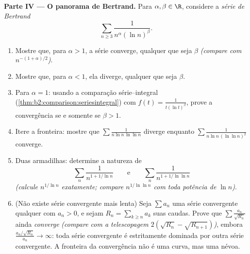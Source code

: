 \begin{problem}[{Problema de fim de semana --- $\zeta(2) = \pi^2/6$ e o
panorama de Bertrand}]
\medskip
\noindent\textbf{Parte IV --- O panorama de Bertrand.} Para $\alpha,
\beta \in \R$, considere a \emph{série de Bertrand}
\[
\sum_{n \geq 3} \frac{1}{n^{\alpha}(\ln n)^{\beta}} .
\]
\begin{enumerate}[resume]
  \item Mostre que, para $\alpha > 1$, a série converge,
        qualquer que seja $\beta$ \emph{(compare com
        $n^{-(1+\alpha)/2}$)}.
  \item Mostre que, para $\alpha < 1$, ela diverge, qualquer que seja
        $\beta$.
  \item Para $\alpha = 1$: usando a comparação série--integral
        (\cref{thm:b2:comparison:seriesintegral}) com $f(t) =
        \frac{1}{t(\ln t)^\beta}$, prove a convergência se e somente se $\beta
        > 1$.
  \item Itere a fronteira: mostre que $\sum\frac{1}{n\ln n\,\ln\ln
        n}$ diverge enquanto $\sum\frac{1}{n\ln n\,(\ln\ln n)^2}$
        converge.
  \item Duas armadilhas: determine a natureza de
        \[
        \sum_n \frac{1}{n^{1 + 1/\ln n}}
        \qquad\text{e}\qquad
        \sum_n \frac{1}{n^{1 + 1/\ln\ln n}}
        \]
        \emph{(calcule $n^{1/\ln n}$ exatamente; compare
        $n^{1/\ln\ln n}$ com toda potência de $\ln n$)}.
  \item (Não existe série convergente mais lenta) Seja $\sum a_n$ uma
        série convergente qualquer com $a_n > 0$, e sejam $R_n = \sum_{k
        \geq n}a_k$ suas caudas. Prove que $\sum
        \frac{a_n}{\sqrt{R_n}}$ ainda \emph{converge}
        \emph{(compare com a telescopagem $2(\sqrt{R_n} -
        \sqrt{R_{n+1}})$)}, embora $\frac{a_n/\sqrt{R_n}}{a_n}
        \to \infty$: toda série convergente é estritamente
        dominada por outra série convergente. A fronteira da
        convergência não é uma curva, mas uma névoa.
\end{enumerate}


\end{problem}
